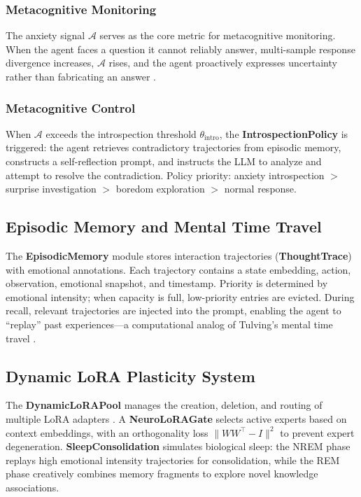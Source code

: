 \documentclass[pdflatex,sn-mathphys-num]{sn-jnl}
\newcommand{\anxiety}{\mathcal{A}}
\theoremstyle{thmstyleone}%
\theoremstyle{thmstyletwo}%
\theoremstyle{thmstylethree}%
\begin{document}
\subsubsection{Metacognitive Monitoring}

The anxiety signal $\anxiety$ serves as the core metric for metacognitive monitoring. When the agent faces a question it cannot reliably answer, multi-sample response divergence increases, $\anxiety$ rises, and the agent proactively expresses uncertainty rather than fabricating an answer \cite{kawato2023metacognitive}.

\subsubsection{Metacognitive Control}

When $\anxiety$ exceeds the introspection threshold $\theta_{\text{intro}}$, the \textbf{IntrospectionPolicy} is triggered: the agent retrieves contradictory trajectories from episodic memory, constructs a self-reflection prompt, and instructs the LLM to analyze and attempt to resolve the contradiction. Policy priority: anxiety introspection $>$ surprise investigation $>$ boredom exploration $>$ normal response.

\subsection{Episodic Memory and Mental Time Travel}

The \textbf{EpisodicMemory} module stores interaction trajectories (\textbf{ThoughtTrace}) with emotional annotations. Each trajectory contains a state embedding, action, observation, emotional snapshot, and timestamp. Priority is determined by emotional intensity; when capacity is full, low-priority entries are evicted. During recall, relevant trajectories are injected into the prompt, enabling the agent to ``replay'' past experiences---a computational analog of Tulving's mental time travel \cite{tulving1985memory}.

\subsection{Dynamic LoRA Plasticity System}

The \textbf{DynamicLoRAPool} manages the creation, deletion, and routing of multiple LoRA adapters \cite{hu2024lora}. A \textbf{NeuroLoRAGate} selects active experts based on context embeddings, with an orthogonality loss $\|WW^\top - I\|^2$ to prevent expert degeneration. \textbf{SleepConsolidation} simulates biological sleep: the NREM phase replays high emotional intensity trajectories for consolidation, while the REM phase creatively combines memory fragments to explore novel knowledge associations.
\end{document}
